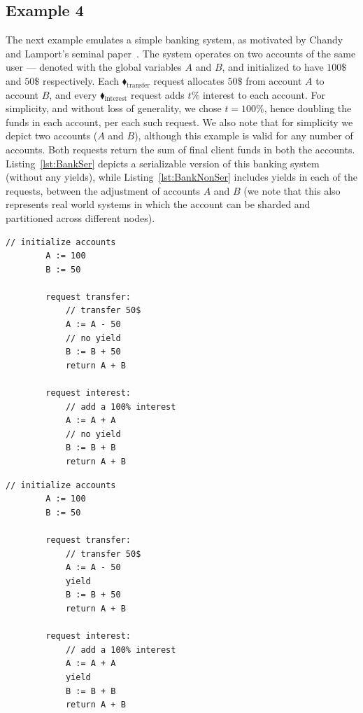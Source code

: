	
	
\subsection{Example 4}

The next example emulates a simple banking system, as motivated by Chandy and Lamport's seminal paper~\cite{ChLa85}. The system operates on two accounts of the same user --- denoted with the global variables $A$ and $B$, and initialized to have $100\$$ and $50\$$ respectively. 
%
Each {\color{ForestGreen}$\blacklozenge_\text{transfer}$} request allocates $50\$$ from account $A$ to account $B$, and every {\color{ForestGreen}$\blacklozenge_\text{interest}$} request adds $t\%$ interest to each account. For simplicity, and without loss of generality, we chose $t=100\%$, hence doubling the funds in each account, per each such request. We also note that for simplicity we depict two accounts ($A$ and $B$), although this example is valid for any number of accounts.
%
Both requests return the sum of final client funds in both the accounts.  
%
Listing~\ref{lst:BankSer} depicts a serializable version of this banking system (without any yields), while Listing~\ref{lst:BankNonSer} includes yields in each of the requests, between the adjustment of accounts $A$ and $B$ (we note that this also represents real world systems in which the account can be sharded and partitioned across different nodes).
%


\noindent
\begin{minipage}[t]{0.45\textwidth}
	\begin{lstlisting}[caption={Serializable},
		label={lst:BankSer}]
	    // initialize accounts
	    A := 100
	    B := 50
	    
	    request transfer: 
	        // transfer 50$
	        A := A - 50
	        // no yield
	        B := B + 50
	        return A + B
				
	    request interest: 
	        // add a 100% interest
	        A := A + A
	        // no yield
	        B := B + B
	        return A + B	      		        
			\end{lstlisting}
\end{minipage}
\hfill
\begin{minipage}[t]{0.45\textwidth}
	\begin{lstlisting}[caption={Not serializable},
		label={lst:BankNonSer}]
	    // initialize accounts
	    A := 100
	    B := 50
			
	    request transfer: 
	        // transfer 50$
	        A := A - 50
	        yield
	        B := B + 50
	        return A + B
	
	    request interest: 
	        // add a 100% interest
	        A := A + A
	        yield
	        B := B + B
	        return A + B	      		        
		\end{lstlisting}
\end{minipage}
	

